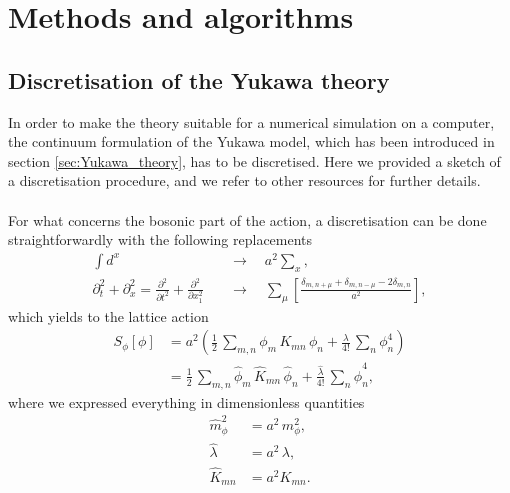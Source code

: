 
\chapter{Methods and algorithms}
\label{chapt:methods}

\section{Discretisation of the Yukawa theory}
\label{sec:lattice_discretisation}
In order to make the theory suitable for a numerical simulation on a computer, the continuum formulation of the Yukawa model, which has been introduced in section \ref{sec:Yukawa_theory}, has to be discretised. Here we provided a sketch of a discretisation procedure, and we refer to other resources \cite{rothe_LGT,gattringer_LQCD,creutz_2023,Montvay1994QuantumLattice} for further details. \\~\\
For what concerns the bosonic part of the action, a discretisation can be done straightforwardly with the following replacements
\begin{equation*}
    \begin{aligned}
        \int d^x \quad &\to \quad a^2 \sum_x, \\
        \partial^2_t + \partial^2_x = \frac{\partial^2}{\partial t^2} + \frac{\partial^2}{\partial x_1^2} \quad &\to \quad \sum_\mu \left[\frac{\delta_{m,n+\mu} + \delta_{m,n-\mu} - 2 \delta_{m,n}}{a^2}\right],
    \end{aligned}
\end{equation*}
which yields to the lattice action
\begin{equation*}
        \begin{aligned} 
        		S_\phi [\phi] 	&=  a^2 \left( \frac{1}{2} \, \sum_{m,n} \phi_m \, K_{mn} \, \phi_n + \frac{\lambda}{4!} \, \sum_n \phi_n^4 \right)\\
        					&=  \frac{1}{2} \, \sum_{m,n} \hat{\phi}_m \, \widehat{K}_{mn} \, \hat{\phi}_n + \frac{\hat{\lambda}}{4!} \, \sum_n \hat{\phi}_n^4,
	\end{aligned}
\end{equation*}
where we expressed everything in dimensionless quantities
\begin{equation}
    \begin{aligned}
        \hat m_\phi^2 &= a^2 \, m_\phi^2, \\
        \hat \lambda &= a^{2} \, \lambda, \\
        \widehat{K}_{mn} &= a^2 K_{mn}.
    \end{aligned}
    \label{eq:couplings_redefinition}
\end{equation}
